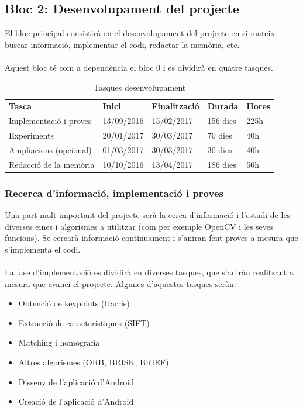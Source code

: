 	\subsection{Bloc 2: Desenvolupament del projecte}
			El bloc principal consistirà en el desenvolupament del projecte en si mateix: buscar informació, implementar el codi, redactar la memòria, etc.\\\\
			Aquest bloc té com a dependència el bloc 0 i es dividirà en quatre tasques.\\
			\begin{table}[H]
				\begin{center}
					\begin{tabular}{p{5cm} !{\vrule width -1pt}x{2.1cm} !{\vrule width -1pt}x{2.4cm} !{\vrule width -1pt}x{1.6cm} !{\vrule width -1pt}x{1.6cm}}
					\textbf{Tasca} & \textbf{Inici} & \textbf{Finalització} & \textbf{Durada} & \textbf{Hores} \\
					Implementació i proves & 13/09/2016 & 15/02/2017 & 156 dies & 225h \\
					Experiments & 20/01/2017 & 30/03/2017 & 70 dies & 40h \\
					Ampliacions (opcional) & 01/03/2017 & 30/03/2017 & 30 dies & 40h \\
					Redacció de la memòria & 10/10/2016 & 13/04/2017 & 186 dies & 50h \\
					\end{tabular}
				\end{center}
				\caption{Tasques desenvolupament}
			\end{table}

		\subsubsection{Recerca d'informació, implementació i proves}
			Una part molt important del projecte serà la cerca d'informació i l'estudi de les diverses eines i algorismes a utilitzar (com per exemple OpenCV i les seves funcions).
			Se cercarà informació contínuament i s'aniran fent proves a mesura que s'implementa el codi.\\\\
			La fase d'implementació es dividirà en diverses tasques, que s'aniràn realitzant a mesura que avanci el projecte. Algunes d'aquestes tasques seràn:
			\begin{itemize}
				\item{Obtenció de keypoints (Harris)}
				\item{Extracció de característiques (SIFT)}
				\item{Matching i homografia}
				\item{Altres algorismes (ORB, BRISK, BRIEF)}
				\item{Disseny de l'aplicació d'Android}
				\item{Creació de l'aplicació d'Android}
			\end{itemize}
